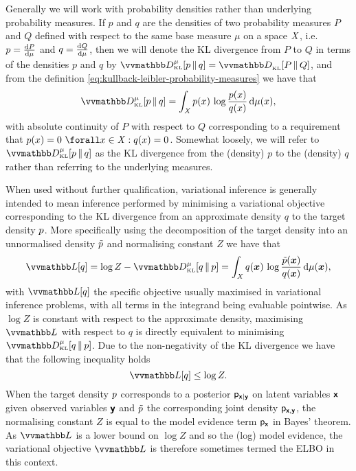 Generally we will work with probability densities rather than underlying probability measures. If $p$ and $q$ are the densities of two probability measures $P$ and $Q$ defined with respect to the same base measure $\mu$ on a space $\mathit{X}$, i.e. $p = \frac{\mathrm{d} P}{\mathrm{d} \mu}$ and $q = \frac{\mathrm{d} Q}{\mathrm{d} \mu}$, then we will denote the \ac{KL} divergence from $P$ to $Q$ in terms of the densities $p$ and $q$ by $\kldiv[\mu]{p}{q} = \kldiv{P}{Q}$, and from the definition \eqref{eq:kullback-leibler-probability-measures} we have that
\begin{equation}\label{eq:kullback-leibler-probability-densities}
  \kldiv[\mu]{p}{q} =
  \int_{\set{X}} p(x) \, \log\frac{p(x)}{q(x)} \, \dr\mu(x),
\end{equation}
with absolute continuity of $P$ with respect to $Q$ corresponding to a requirement that $p(x) = 0 ~\forall x \in \set{X} : q(x) = 0$. Somewhat loosely, we will refer to $\kldiv[\mu]{p}{q}$ as the \ac{KL} divergence from the (density) $p$ to the (density) $q$ rather than referring to the underlying measures.

When used without further qualification, variational inference is generally intended to mean inference performed by minimising a variational objective corresponding to the \ac{KL} divergence from an approximate density $q$ to the target density $p$. More specifically using the decomposition of the target density into an unnormalised density $\tilde{p}$ and normalising constant $Z$ we have that
\begin{equation}\label{eq:kullback-leibler-var-obj}
  \varobj\lsb q \rsb = \log Z - \kldiv[\mu]{q}{\tgtdens} =
  \int_{\set{X}} q(\vct{x})\,\log \frac{\utgtdens(\vct{x})}{q(\vct{x})} \,\dr\mu(\vct{x}),
\end{equation}
with $\varobj\lsb q \rsb$ the specific objective usually maximised in variational inference problems, with all terms in the integrand being evaluable pointwise. As $\log Z$ is constant with respect to the approximate density, maximising $\varobj$ with respect to $q$ is directly equivalent to minimising $\kldiv[\mu]{q}{\tgtdens}$. Due to the non-negativity of the \ac{KL} divergence we have that the following inequality holds
\begin{equation}\label{eq:evidence-lower-bound}
  \varobj\lsb q \rsb \leq \log Z.
\end{equation}
When the target density $p$ corresponds to a posterior $\mathsf{p}_{\boldsymbol{\mathsf{x}}|\boldsymbol{\mathsf{y}}}$ on latent variables $\boldsymbol{\mathsf{x}}$ given observed variables $\boldsymbol{\mathsf{y}}$ and $\tilde{p}$ the corresponding joint density $\mathsf{p}_{\boldsymbol{\mathsf{x}},\boldsymbol{\mathsf{y}}}$, the normalising constant $Z$ is equal to the model evidence term $\mathsf{p}_{\boldsymbol{\mathsf{x}}}$ in Bayes' theorem. As $\varobj$ is a lower bound on $\log Z$ and so the (log) model evidence, the variational objective $\varobj$ is therefore sometimes termed the \ac{ELBO} in this context.

